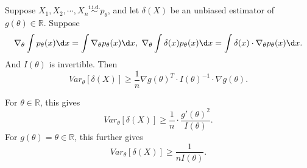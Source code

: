\documentclass[a4paper]{article}
\begin{document}
\begin{thm}
	Suppose $X_1,X_2,\cdots,X_n \stackrel{\text{i.i.d.}}{\sim} p_{\theta}$, and let $\delta(X)$ be an unbiased estimator of $g(\theta) \in \mathbb{R}$. Suppose
	\begin{equation*}
		\nabla_{\theta} \int p_{\theta}(x) \d x = \int \nabla_{\theta} p_{\theta}(x) \d x, \ \nabla_{\theta} \int \delta(x) p_{\theta}(x) \d x = \int \delta(x) \cdot \nabla_{\theta} p_{\theta}(x) \d x.
	\end{equation*}
	And $I(\theta)$ is invertible. Then
	\begin{equation}
		Var_{\theta}[\delta(X)] \geq \frac{1}{n} \nabla g(\theta)^T \cdot I(\theta)^{-1} \cdot \nabla g(\theta).
	\end{equation}
\end{thm}

\begin{note}
	For $\theta \in \mathbb{R}$, this gives
	\begin{equation}
		Var_{\theta}[\delta(X)] \geq \frac{1}{n} \cdot \frac{g'(\theta)^2}{I(\theta)}.
	\end{equation}
	For $g(\theta) = \theta \in \mathbb{R}$, this further gives
	\begin{equation}
		Var_{\theta}[\delta(X)] \geq \frac{1}{nI(\theta)}.
	\end{equation}
\end{note}
\end{document}
